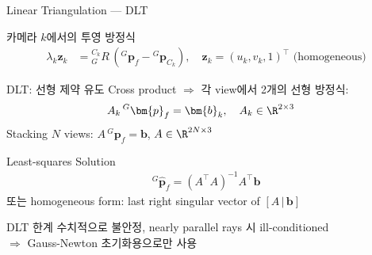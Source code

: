\begin{frame}[shrink=10]{Linear Triangulation --- DLT}
  \begin{block}{카메라 $k$에서의 투영 방정식}
    \begin{align*}
      \lambda_k \bm{z}_k &= {}^{C_k}_G R\,({}^G\bm{p}_f - {}^G\bm{p}_{C_k}), \quad
      \bm{z}_k = (u_k, v_k, 1)^\top \text{ (homogeneous)}
    \end{align*}
  \end{block}
  \begin{block}{DLT: 선형 제약 유도}
    Cross product $\Rightarrow$ 각 view에서 2개의 선형 방정식:
    \begin{align*}
      A_k\,{}^G\bm{p}_f &= \bm{b}_k, \quad A_k \in \R^{2\times 3}
    \end{align*}
    Stacking $N$ views: $A\,{}^G\bm{p}_f = \bm{b}$, $A \in \R^{2N\times 3}$
  \end{block}
  \begin{block}{Least-squares Solution}
    \begin{align*}
      {}^G\hat{\bm{p}}_f = (A^\top A)^{-1} A^\top \bm{b}
    \end{align*}
    또는 homogeneous form: last right singular vector of $[A\,|\,\bm{b}]$
  \end{block}
  \begin{alertblock}{DLT 한계}
    수치적으로 불안정, nearly parallel rays 시 ill-conditioned\\
    $\Rightarrow$ Gauss-Newton 초기화용으로만 사용
  \end{alertblock}
\end{frame}


